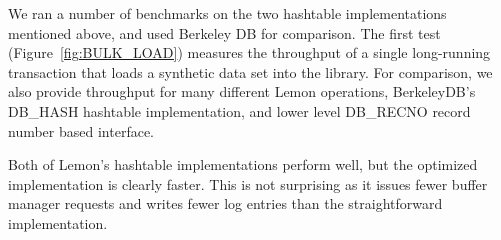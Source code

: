 \documentclass[10pt,letterpaper,twocolumn,english]{article}
\newcommand{\yad}{Lemon\xspace}
\newcommand{\eab}[1]{\textcolor{red}{\bf EAB: #1}}
\begin{document}
We ran a number of benchmarks on the two hashtable implementations
mentioned above, and used Berkeley DB for comparison.
The first test (Figure~\ref{fig:BULK_LOAD}) measures the throughput of
a single long-running
transaction that loads a synthetic data set into the
library.  For comparison, we also provide throughput for many different
\yad operations, BerkeleyDB's DB\_HASH hashtable implementation,
and lower level DB\_RECNO record number based interface.  

Both of \yad's hashtable implementations perform well, but the
optimized implementation is clearly faster.  This is not surprising as
it issues fewer buffer manager requests and writes fewer log entries
than the straightforward implementation.



\end{document}
